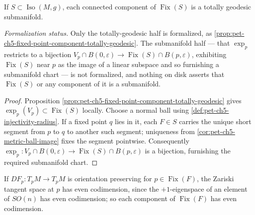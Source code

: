 \begin{proposition}
  \label{prop:pet-ch5-fixed-point-totally-geodesic}
  If $S\subset\operatorname{Iso}(M,g)$, each connected component of
  $\operatorname{Fix}(S)$ is a totally geodesic submanifold.

  \emph{Formalization status.} Only the totally-geodesic half is formalized, as
  \cref{prop:pet-ch5-fixed-point-component-totally-geodesic}. The submanifold half
  — that $\exp_p$ restricts to a bijection $V_p\cap B(0,\varepsilon)\to
  \operatorname{Fix}(S)\cap B(p,\varepsilon)$, exhibiting $\operatorname{Fix}(S)$
  near $p$ as the image of a linear subspace and so furnishing a submanifold chart
  — is not formalized, and nothing on disk asserts that
  $\operatorname{Fix}(S)$ or any component of it is a submanifold.
\end{proposition}
\begin{proof}
  \sketch
  Proposition \cref{prop:pet-ch5-fixed-point-component-totally-geodesic} gives
  $\exp_p(V_p)\subset\operatorname{Fix}(S)$ locally.  Choose a normal ball using
  \cref{def:pet-ch5-injectivity-radius}.  If a fixed point $q$ lies in it, each
  $F\in S$ carries the unique short segment from $p$ to $q$ to another such segment;
  uniqueness from \cref{cor:pet-ch5-metric-ball-image} fixes the segment pointwise.
  Consequently
  $\exp_p:V_p\cap B(0,\varepsilon)\to\operatorname{Fix}(S)\cap B(p,\varepsilon)$
  is a bijection, furnishing the required submanifold chart.
\end{proof}

\begin{remark}
  \label{rem:pet-ch5-fixed-point-codimension}
  If $DF_p:T_pM\to T_pM$ is orientation preserving for $p\in\operatorname{Fix}(F)$,
  the Zariski tangent space at $p$ has even codimension, since the $+1$-eigenspace
  of an element of $SO(n)$ has even codimension; so each component of
  $\operatorname{Fix}(F)$ has even codimension.
\end{remark}

